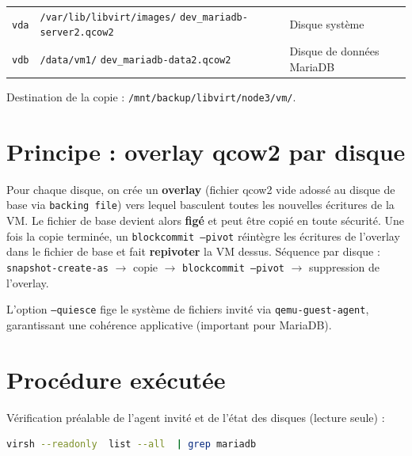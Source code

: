 \documentclass{csbulletin}
\begin{document}
\begin{longtable}{| L{1.6cm} | L{5.7cm} | L{3.5cm} |}
  \hline
   &  &
   \\
  \hline
  \endhead
  \texttt{vda} & \texttt{/var/lib/libvirt/images/} \texttt{dev\_mariadb-server2.qcow2} &
    Disque système \\
  \hline
  \texttt{vdb} & \texttt{/data/vm1/} \texttt{dev\_mariadb-data2.qcow2} &
    Disque de données MariaDB \\
  \hline
\end{longtable}

Destination de la copie : \texttt{/mnt/backup/libvirt/node3/vm/}.


\section{Principe : overlay qcow2 par disque}

Pour chaque disque, on crée un \textbf{overlay} (fichier qcow2 vide adossé au
disque de base via \texttt{backing file}) vers lequel basculent toutes les
nouvelles écritures de la VM. Le fichier de base devient alors \textbf{figé} et
peut être copié en toute sécurité. Une fois la copie terminée, un
\texttt{blockcommit --pivot} réintègre les écritures de l'overlay dans le
fichier de base et fait \textbf{repivoter} la VM dessus. Séquence par disque :
\texttt{snapshot-create-as} $\rightarrow$ copie $\rightarrow$
\texttt{blockcommit --pivot} $\rightarrow$ suppression de l'overlay.

L'option \texttt{--quiesce} fige le système de fichiers invité via
\texttt{qemu-guest-agent}, garantissant une cohérence applicative (important
pour MariaDB).


\section{Procédure exécutée}

Vérification préalable de l'agent invité et de l'état des disques
(lecture seule) :
\begin{lstlisting}[language=bash]
virsh --readonly  list --all  | grep mariadb
\end{lstlisting}
\end{document}
